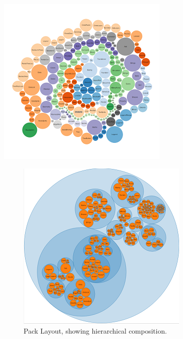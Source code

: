 \documentclass[12pt,onecolumn]{article}
\begin{document}
   \begin{center}
   	\includegraphics[width=\textwidth]{bubblechart.PNG}
   	\label{fig:bubblechart}
   \end{center}
   
   \begin{figure}
   	\centering
   	\includegraphics[scale=1]{packlayout.PNG}
   	\caption{Pack Layout, showing hierarchical composition.} \label{fig:packlayout}
   \end{figure}
   
\end{document}
